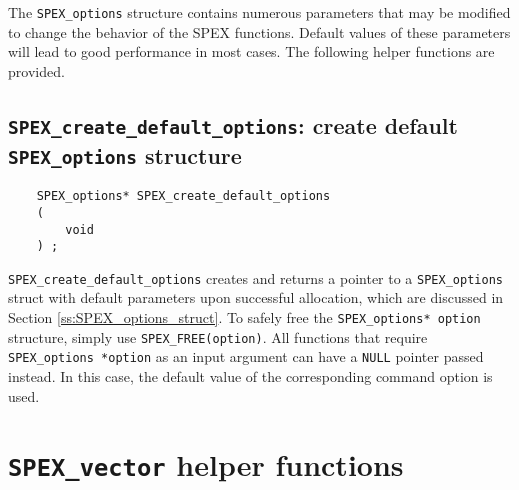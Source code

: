 \documentclass[12pt]{report}
\theoremstyle{definition}
\begin{document}
The \verb|SPEX_options| structure contains numerous parameters that may be
modified to change the behavior of the SPEX functions.  Default values of
these parameters will lead to good performance in most cases. The following helper functions
are provided.




\subsection{\texttt{SPEX\_create\_default\_options}: create default \texttt{SPEX\_options} structure}
\label{ss:create_default_options}

\begin{mdframed}[userdefinedwidth=6in]
{\footnotesize
\begin{verbatim}
    SPEX_options* SPEX_create_default_options
    (
        void
    ) ;
\end{verbatim}
} \end{mdframed}

\verb|SPEX_create_default_options| creates and returns a pointer to a
\verb|SPEX_options| struct with default parameters upon successful allocation,
which are discussed in Section \ref{ss:SPEX_options_struct}.  To safely free
the \verb|SPEX_options* option| structure, simply use \newline \verb|SPEX_FREE(option)|.
All functions that require \verb|SPEX_options *option| as an input argument can
have a \verb'NULL' pointer passed instead. In this case, the default value of
the corresponding command option is used. 

\section{\texttt{SPEX\_vector} helper functions} \label{s:spex_vector_helper}
\end{document}

